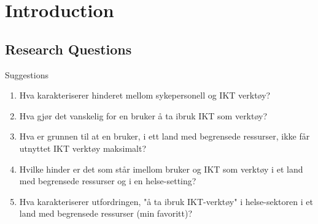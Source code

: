 \chapter{Introduction}
\section{Research Questions}
\large{Suggestions}
\begin{enumerate}
\item Hva karakteriserer hinderet mellom sykepersonell og IKT verktøy?
\item Hva gjør det vanskelig for en bruker å ta ibruk IKT som verktøy?
\item Hva er grunnen til at en bruker, i ett land med begrensede ressurser, ikke får utnyttet IKT verktøy maksimalt?
\item Hvilke hinder er det som står imellom bruker og IKT som verktøy i et land med begrensede ressurser og i en helse-setting?
\item Hva karakteriserer utfordringen, "å ta ibruk IKT-verktøy" i helse-sektoren i et land med begrensede ressurser (min favoritt)?
\end{enumerate}